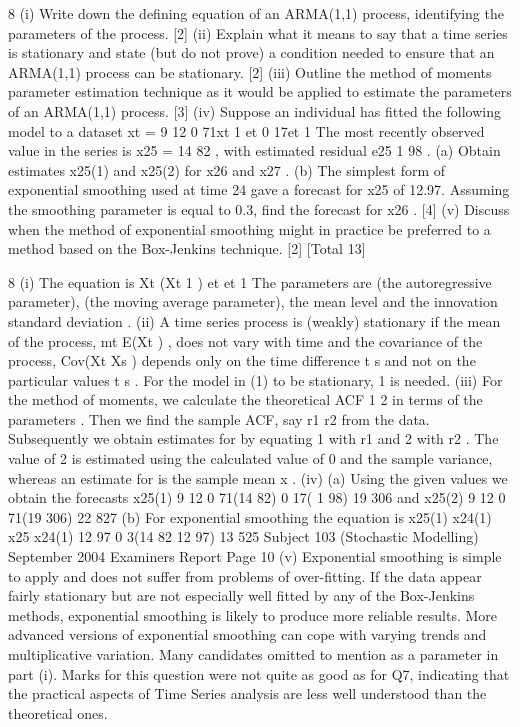 
8 (i) Write down the defining equation of an ARMA(1,1) process, identifying the
parameters of the process. [2]
(ii) Explain what it means to say that a time series is stationary and state (but do
not prove) a condition needed to ensure that an ARMA(1,1) process can be
stationary. [2]
(iii) Outline the method of moments parameter estimation technique as it would be
applied to estimate the parameters of an ARMA(1,1) process. [3]
(iv) Suppose an individual has fitted the following model to a dataset
xt = 9 12 0 71xt 1 et 0 17et 1
The most recently observed value in the series is x25 = 14 82 , with estimated
residual e25 1 98 .
(a) Obtain estimates x25(1) and x25(2) for x26 and x27 .
(b) The simplest form of exponential smoothing used at time 24 gave a
forecast for x25 of 12.97. Assuming the smoothing parameter is equal
to 0.3, find the forecast for x26 .
[4]
(v) Discuss when the method of exponential smoothing might in practice be
preferred to a method based on the Box-Jenkins technique. [2]
[Total 13]


8 (i) The equation is
Xt (Xt 1 ) et et 1
The parameters are (the autoregressive parameter), (the moving average
parameter), the mean level and the innovation standard deviation .
(ii) A time series process is (weakly) stationary if the mean of the process,
mt E(Xt ) , does not vary with time and the covariance of the process,
Cov(Xt Xs ) depends only on the time difference t s and not on the
particular values t s .
For the model in (1) to be stationary, 1 is needed.
(iii) For the method of moments, we calculate the theoretical ACF 1 2 in terms
of the parameters . Then we find the sample ACF, say r1 r2 from the data.
Subsequently we obtain estimates for by equating 1 with r1 and 2
with r2 .
The value of 2 is estimated using the calculated value of 0 and the sample
variance, whereas an estimate for is the sample mean x .
(iv) (a) Using the given values we obtain the forecasts
x25(1) 9 12 0 71(14 82) 0 17( 1 98) 19 306
and
x25(2) 9 12 0 71(19 306) 22 827
(b) For exponential smoothing the equation is
x25(1) x24(1) x25 x24(1) 12 97 0 3(14 82 12 97) 13 525
Subject 103 (Stochastic Modelling) September 2004 Examiners Report
Page 10
(v) Exponential smoothing is simple to apply and does not suffer from problems
of over-fitting. If the data appear fairly stationary but are not especially well
fitted by any of the Box-Jenkins methods, exponential smoothing is likely to
produce more reliable results. More advanced versions of exponential
smoothing can cope with varying trends and multiplicative variation.
Many candidates omitted to mention as a parameter in part (i). Marks for
this question were not quite as good as for Q7, indicating that the practical
aspects of Time Series analysis are less well understood than the theoretical
ones.

